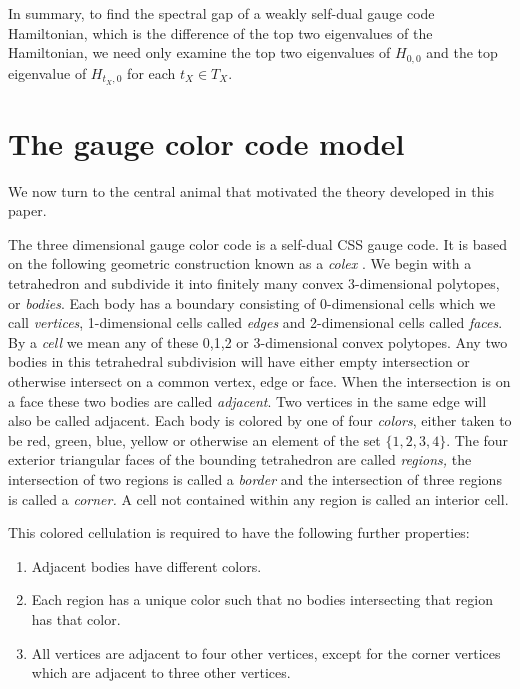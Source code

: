 \documentclass[12pt]{article}
\begin{document}
In summary, 
to find the spectral gap of a weakly self-dual gauge code Hamiltonian,
which is the difference of the top two eigenvalues of the Hamiltonian,
we need only examine the top two eigenvalues of $H_{0,0}$ and 
the top eigenvalue of $H_{t_X,0}$ for each $t_X\in T_X.$ 

\section{The gauge color code model}

%

We now turn to the central animal that motivated
the theory developed in this paper.

The three dimensional gauge color code \cite{Bombin2015,Bombin2015single,Kubica2015}
is a self-dual CSS gauge code. 
It is based on the following geometric construction known
as a \emph{colex} \cite{Bombin2007exact}.
We begin with a tetrahedron and subdivide it into finitely many
convex 3-dimensional polytopes, or \emph{bodies}.
Each body has a boundary consisting of 0-dimensional cells
which we call \emph{vertices}, 1-dimensional cells called \emph{edges}
and 2-dimensional cells called \emph{faces}.
By a \emph{cell} we mean any of these 0,1,2 or 3-dimensional convex polytopes.
Any two bodies in this tetrahedral subdivision will
have either empty intersection or otherwise intersect
on a common vertex, edge or face.
When the intersection is on a face these two bodies
are called \emph{adjacent}.
Two vertices in the same edge will also be called adjacent.
Each body is colored by one of four \emph{colors},
either taken to be red, green, blue, yellow or 
otherwise an element of the set $\{1, 2, 3, 4\}.$
The four exterior triangular faces of the bounding tetrahedron are
called \emph{regions,} the intersection of two regions is called
a \emph{border} and the intersection of three regions is called
a \emph{corner.}
A cell not contained within any region is called an interior cell.

This colored cellulation is required to have the following further properties:
\begin{enumerate}
\item Adjacent bodies have different colors.
\item Each region has a unique color 
such that no bodies intersecting that region has that color.
\item All vertices are adjacent to four other vertices,
except for the corner vertices which are adjacent to three other vertices.
\end{enumerate}
\end{document}
